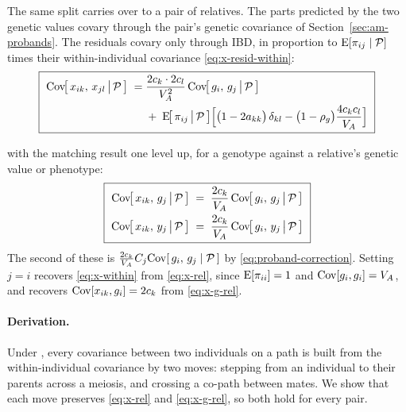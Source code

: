 \documentclass[12pt]{article}
\begin{document}
The same split carries over to a pair of relatives.
The parts predicted by the two genetic values covary through the pair's genetic covariance of Section~\ref{sec:am-probands}.
The residuals covary only through IBD, in proportion to $\mathrm{E}[\pi_{ij}\mid\mathcal{P}]$ times their within-individual covariance \eqref{eq:x-resid-within}:
\begin{equation}\label{eq:x-rel}
    \boxed{\ \begin{aligned}
    \mathrm{Cov}\!\big[\,x_{ik},\, x_{jl} \,\big|\, \mathcal{P}\,\big]
    \;=\;& \frac{2c_k \cdot 2c_l}{V_A^2}\,\mathrm{Cov}\!\big[\,g_i,\, g_j \,\big|\, \mathcal{P}\,\big] \\
    &+\; \mathrm{E}\!\big[\,\pi_{ij} \,\big|\, \mathcal{P}\,\big] \Big[\big(1 - 2a_{kk}\big)\,\delta_{kl} - \big(1-\rho_g\big)\frac{4c_k c_l}{V_A}\Big]
    \end{aligned} \ }
\end{equation}

with the matching result one level up, for a genotype against a relative's genetic value or phenotype:
\begin{equation}\label{eq:x-g-rel}
    \boxed{\ \begin{aligned}
    \mathrm{Cov}\!\big[\,x_{ik},\, g_j \,\big|\, \mathcal{P}\,\big] \;&=\; \frac{2c_k}{V_A}\,\mathrm{Cov}\!\big[\,g_i,\, g_j \,\big|\, \mathcal{P}\,\big] \\
    \mathrm{Cov}\!\big[\,x_{ik},\, y_j \,\big|\, \mathcal{P}\,\big] \;&=\; \frac{2c_k}{V_A}\,\mathrm{Cov}\!\big[\,g_i,\, y_j \,\big|\, \mathcal{P}\,\big]
    \end{aligned} \ }
\end{equation}
The second of these is $\tfrac{2c_k}{V_A} C_j \mathrm{Cov}[\,g_i,\, g_j \mid \mathcal{P}\,]$ by \eqref{eq:proband-correction}.
Setting $j = i$ recovers \eqref{eq:x-within} from \eqref{eq:x-rel}, since $\mathrm{E}[\pi_{ii}] = 1$ and $\mathrm{Cov}[g_i, g_i] = V_A$, and recovers $\mathrm{Cov}[x_{ik}, g_i] = 2c_k$ from \eqref{eq:x-g-rel}.

\paragraph{Derivation.}
Under , every covariance between two individuals on a path is built from the within-individual covariance by two moves: stepping from an individual to their parents across a meiosis, and crossing a co-path between mates.
We show that each move preserves \eqref{eq:x-rel} and \eqref{eq:x-g-rel}, so both hold for every pair.
\end{document}
